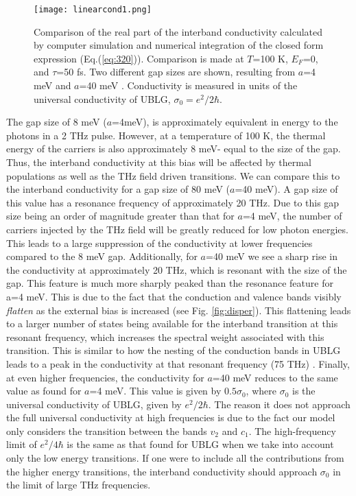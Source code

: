\documentclass[twocolumn,secnumarabic,amssymb, nobibnotes, aps, prd, superscriptaddress]{revtex4-1}
\begin{document}
\begin{figure}[h]
\centering
\texttt{[image: linearcond1.png]}
\caption{Comparison of the real part of the interband conductivity calculated by computer simulation and numerical integration of the closed form expression (Eq.(\ref{eq:320})). Comparison is made at $T$=100 K, $E_F$=0, and $\tau$=50 fs.
  Two different gap sizes are shown, resulting from $a$=4 meV and $a$=40 meV . Conductivity is measured in units of the universal conductivity of UBLG, $\sigma_{0}=e^{2}/2\hbar$\label{fig:5.4}.}
\end{figure}

The gap size of 8 meV ($a$=4meV), is approximately equivalent in energy to the photons in a 2 THz pulse. However, at a temperature of 100 K, the thermal energy of the carriers is also approximately 8 meV- equal to the size of the gap. Thus, the interband conductivity at this bias will be affected by thermal populations as well as the THz field driven transitions. We can compare this to the interband conductivity for a gap size of 80 meV ($a$=40 meV). A gap size of this value has a resonance frequency of approximately 20 THz. Due to this gap size being an order of magnitude greater than that for $a$=4 meV, the number of carriers injected by the THz field will be greatly reduced for low photon energies. This leads to a large suppression of the conductivity at lower frequencies compared to the 8 meV gap. Additionally, for $a$=40 meV we see a sharp rise in the conductivity at approximately 20 THz, which is resonant with the size of the gap. This feature is much more sharply peaked than the resonance feature for a=4 meV. This is due to the fact that the conduction and valence bands visibly \textit{flatten} as the external bias is increased (see Fig. \ref{fig:disper}). This flattening leads to a larger number of states being available for the interband transition at this resonant frequency, which increases the spectral weight associated with this transition. This is similar to how the nesting of the conduction bands in UBLG leads to a peak in the conductivity at that resonant frequency (75 THz) \cite{mcgouran2016nonlinear}. Finally, at even higher frequencies, the conductivity for $a$=40 meV reduces to the same value as found for $a$=4 meV. This value is given by $0.5\sigma_{0}$, where $\sigma_{0}$ is the universal conductivity of UBLG, given by $e^{2}/2\hbar$. The reason it does not approach the full universal conductivity at high frequencies is due to the fact our model only considers the transition between the bands $v_2$ and $c_1$. The high-frequency limit of $e^{2}/4\hbar$ is the same as that found for UBLG when we take into account only the low energy transitions\cite{mcgouran2016nonlinear}. If one were to include all the contributions from the higher energy transitions, the interband conductivity should approach $\sigma_{0}$ in the limit of large THz frequencies. 
\end{document}
